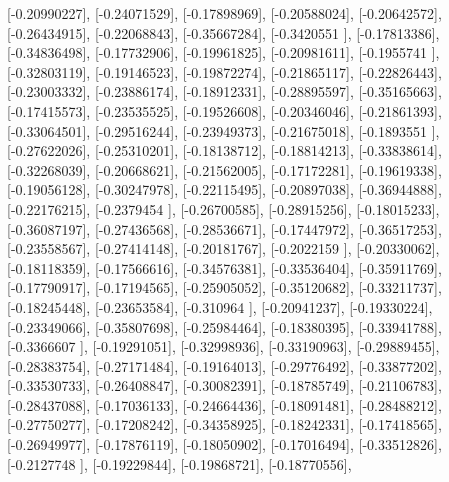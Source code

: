 \documentclass{article}
\begin{document}
       [-0.20990227],
       [-0.24071529],
       [-0.17898969],
       [-0.20588024],
       [-0.20642572],
       [-0.26434915],
       [-0.22068843],
       [-0.35667284],
       [-0.3420551 ],
       [-0.17813386],
       [-0.34836498],
       [-0.17732906],
       [-0.19961825],
       [-0.20981611],
       [-0.1955741 ],
       [-0.32803119],
       [-0.19146523],
       [-0.19872274],
       [-0.21865117],
       [-0.22826443],
       [-0.23003332],
       [-0.23886174],
       [-0.18912331],
       [-0.28895597],
       [-0.35165663],
       [-0.17415573],
       [-0.23535525],
       [-0.19526608],
       [-0.20346046],
       [-0.21861393],
       [-0.33064501],
       [-0.29516244],
       [-0.23949373],
       [-0.21675018],
       [-0.1893551 ],
       [-0.27622026],
       [-0.25310201],
       [-0.18138712],
       [-0.18814213],
       [-0.33838614],
       [-0.32268039],
       [-0.20668621],
       [-0.21562005],
       [-0.17172281],
       [-0.19619338],
       [-0.19056128],
       [-0.30247978],
       [-0.22115495],
       [-0.20897038],
       [-0.36944888],
       [-0.22176215],
       [-0.2379454 ],
       [-0.26700585],
       [-0.28915256],
       [-0.18015233],
       [-0.36087197],
       [-0.27436568],
       [-0.28536671],
       [-0.17447972],
       [-0.36517253],
       [-0.23558567],
       [-0.27414148],
       [-0.20181767],
       [-0.2022159 ],
       [-0.20330062],
       [-0.18118359],
       [-0.17566616],
       [-0.34576381],
       [-0.33536404],
       [-0.35911769],
       [-0.17790917],
       [-0.17194565],
       [-0.25905052],
       [-0.35120682],
       [-0.33211737],
       [-0.18245448],
       [-0.23653584],
       [-0.310964  ],
       [-0.20941237],
       [-0.19330224],
       [-0.23349066],
       [-0.35807698],
       [-0.25984464],
       [-0.18380395],
       [-0.33941788],
       [-0.3366607 ],
       [-0.19291051],
       [-0.32998936],
       [-0.33190963],
       [-0.29889455],
       [-0.28383754],
       [-0.27171484],
       [-0.19164013],
       [-0.29776492],
       [-0.33877202],
       [-0.33530733],
       [-0.26408847],
       [-0.30082391],
       [-0.18785749],
       [-0.21106783],
       [-0.28437088],
       [-0.17036133],
       [-0.24664436],
       [-0.18091481],
       [-0.28488212],
       [-0.27750277],
       [-0.17208242],
       [-0.34358925],
       [-0.18242331],
       [-0.17418565],
       [-0.26949977],
       [-0.17876119],
       [-0.18050902],
       [-0.17016494],
       [-0.33512826],
       [-0.2127748 ],
       [-0.19229844],
       [-0.19868721],
       [-0.18770556],
\end{document}
